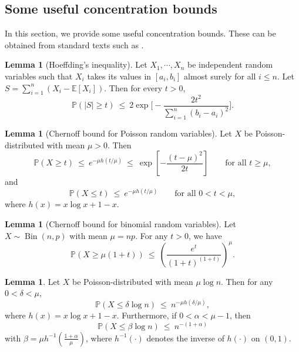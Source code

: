 \documentclass[letterpaper,11pt]{article}
\newtheorem{lem}[thm]{Lemma}
\theoremstyle{definition}
\def\E{\mathbb{E}}
\def\P{\mathbb{P}}
\def\wle{ \ \le \ }
\newcommand{\Bin}{\operatorname{Bin}}
\newcommand{\Poi}{\operatorname{Poi}}
\numberwithin{equation}{section}
\newcommand{\al}{\alpha}
\newcommand{\be}{\beta}
\newcommand{\de}{\delta}
\newcommand{\eps}{\epsilon}
\newcommand{\LLupdated}[1]{{\color{purple}#1}}
\newtheorem{lem}[thm]{Lemma}
\theoremstyle{definition}
\def\E{\mathbb{E}}
\def\P{\mathbb{P}}
\def\wle{ \ \le \ }
\newcommand{\Bin}{\operatorname{Bin}}
\newcommand{\Poi}{\operatorname{Poi}}
\numberwithin{equation}{section}
\newcommand{\al}{\alpha}
\newcommand{\be}{\beta}
\newcommand{\de}{\delta}
\newcommand{\eps}{\epsilon}
\newcommand{\LLupdated}[1]{{\color{purple}#1}}
\theoremstyle{thmstyletwo}%
\begin{document}



\begin{appendices}

\section{Some useful concentration bounds}

In this section, we provide some useful concentration bounds. These can be obtained from standard texts such as \cite{boucheron2003concentration}.

\begin{lem}[Hoeffding's inequality]
Let $X_1 ,\cdots , X_n$ be independent random variables such that $X_i$ takes its values in $[a_i , b_i ]$ almost surely for all $i \le n$. Let
$S = \sum_{i=1}^n (X_i-\E[X_i])$. Then for every $t>0$,
\[
 \P(|S|\ge t)
 \wle 2\exp\bigg[-\frac{2t^2}{\sum_{i=1}^n (b_i-a_i)^2}\bigg].
\]    
\label{lem:hoeffding}
\end{lem}

\begin{lem}[Chernoff bound for Poisson random variables]
\label{lem:conc_poisson}
Let $X$ be Poisson-distributed with mean $\mu > 0$.
Then
\[
 \P(X \ge t)
 \wle e^{-\mu h(t/\mu)} \wle \exp\left[-\frac{(t-\mu)^2}{2t}\right]
 \qquad \text{for all $t \ge \mu$},
\]
and
\[
 \P(X \le t ) 
 \wle e^{-\mu h(t/\mu)}
 \qquad \text{for all $0 < t < \mu$},
\]
where $h(x) = x \log x + 1 - x$.
\end{lem}

\begin{lem}[Chernoff bound for binomial random variables]
Let $X \sim \Bin(n,p)$ with mean $\mu=np$.
For any $t>0$, we have
\[
 \P(X \ge \mu(1+t))
 \wle \left(\frac{e^t}{(1+t)^{(1+t)}}\right)^\mu.
\]
\label{lem:conc_binomial}
\end{lem}

\begin{lem}
\label{lem:conc_poisson_new}
Let $X$ be Poisson-distributed with mean $\mu \log n$. Then for any $0 < \delta < \mu$,
\[
 \P( X \le \delta \log n )
 \wle n^{- \mu h(\de/\mu)},
\]
where
$h(x) = x \log x + 1 - x$.
Furthermore, if $0 < \al < \mu-1$, then
\[
 \P( X \le \be \log n )
 \wle n^{-(1 + \al)}
\]
with $\be = \mu h^{-1}( \frac{1+\al}{\mu} )$,
where $h^{-1}(\cdot)$ denotes the inverse of $h(\cdot)$ on $(0,1)$.
\end{lem}



\end{appendices}
\end{document}
